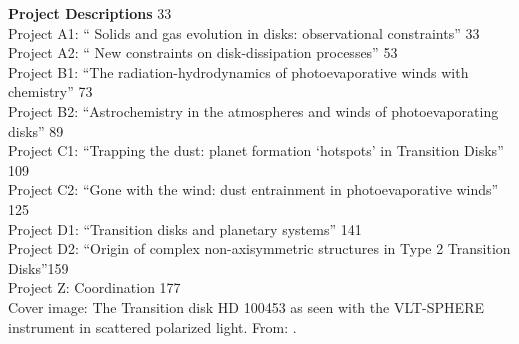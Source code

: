 \documentclass[10pt,fleqn,twoside,a4paper]{article}
\begin{document}
{\bf Project Descriptions } \hfill 33 \\
Project A1: `` Solids and gas evolution in disks: observational
constraints'' \hfill  33 \\
Project A2: ``
New constraints on disk-dissipation processes''  \hfill 53 \\
Project B1: ``The radiation-hydrodynamics of photoevaporative winds
with chemistry'' \hfill 73 \\
Project B2: ``Astrochemistry in the atmospheres and winds of
photoevaporating disks'' \hfill 89 \\
Project C1: ``Trapping the dust:
planet formation ‘hotspots’ in Transition Disks'' \hfill 109 \\
Project C2: ``Gone with the wind:
dust entrainment in photoevaporative winds'' \hfill 125 \\
Project D1: ``Transition disks and planetary systems'' \hfill 141\\
Project D2: ``Origin of complex non-axisymmetric structures in Type 2 Transition Disks''\hfill 159 \\
Project Z: Coordination \hfill 177 \\




\vfill
Cover image: The Transition disk HD 100453 as seen with the VLT-SPHERE 
instrument in scattered polarized light. From: \citet{2017A&A...597A..42B}.

\pagebreak[4]

\pagestyle{plain}
\end{document}
